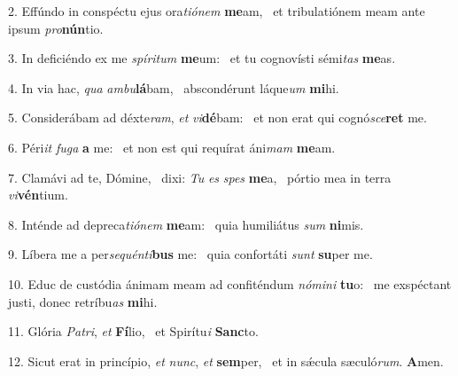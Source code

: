 2. Effúndo in conspéctu ejus ora\textit{ti}\textit{ó}\textit{nem} \textbf{me}am, \ast\  et tribulatiónem meam ante ipsum \textit{pro}\textbf{nún}tio.\

3. In deficiéndo ex me \textit{spí}\textit{ri}\textit{tum} \textbf{me}um: \ast\  et tu cognovísti sémi\textit{tas} \textbf{me}as.\

4. In via hac, \textit{qua} \textit{am}\textit{bu}\textbf{lá}bam, \ast\  abscondérunt láque\textit{um} \textbf{mi}hi.\

5. Considerábam ad déxte\textit{ram}, \textit{et} \textit{vi}\textbf{dé}bam: \ast\  et non erat qui cognó\textit{sce}\textbf{ret} me.\

6. Péri\textit{it} \textit{fu}\textit{ga} \textbf{a} me: \ast\  et non est qui requírat áni\textit{mam} \textbf{me}am.\

7. Clamávi ad te, Dómine, \dag\  dixi: \textit{Tu} \textit{es} \textit{spes} \textbf{me}a, \ast\  pórtio mea in terra \textit{vi}\textbf{vén}tium.\

8. Inténde ad depreca\textit{ti}\textit{ó}\textit{nem} \textbf{me}am: \ast\  quia humiliátus \textit{sum} \textbf{ni}mis.\

9. Líbera me a per\textit{se}\textit{quén}\textit{ti}\textbf{bus} me: \ast\  quia confortáti \textit{sunt} \textbf{su}per me.\

10. Educ de custódia ánimam meam ad confiténdum \textit{nó}\textit{mi}\textit{ni} \textbf{tu}o: \ast\  me exspéctant justi, donec retríbu\textit{as} \textbf{mi}hi.\

11. Glória \textit{Pa}\textit{tri}, \textit{et} \textbf{Fí}lio, \ast\  et Spirítu\textit{i} \textbf{Sanc}to.\

12. Sicut erat in princípio, \textit{et} \textit{nunc}, \textit{et} \textbf{sem}per, \ast\  et in sǽcula sæculó\textit{rum}. \textbf{A}men.\

